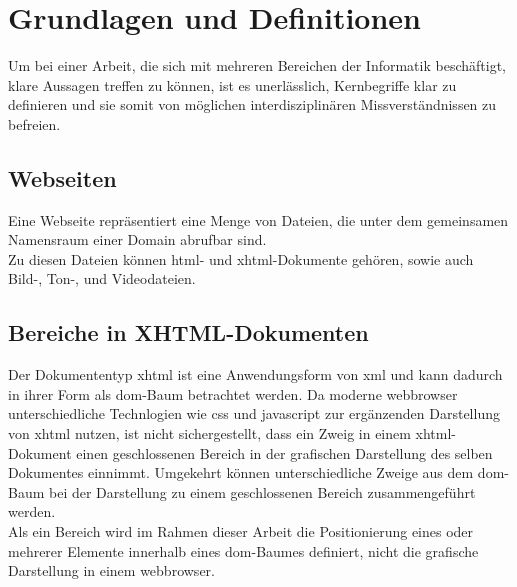 
\chapter{Grundlagen und Definitionen}
\label{chp:GrundlagenDefinitionen}

Um bei einer Arbeit, die sich mit mehreren Bereichen der Informatik beschäftigt, klare Aussagen treffen zu können, ist es unerlässlich, Kernbegriffe klar zu
definieren und sie somit von möglichen interdisziplinären Missverständnissen zu befreien.

\section{Webseiten}
\label{sec:GrundlagenDefinitionen:Webseiten}
Eine Webseite repräsentiert eine Menge von Dateien, die unter dem gemeinsamen Namensraum einer Domain abrufbar sind.\\
Zu diesen Dateien können \gls{html}- und \gls{xhtml}-Dokumente gehören, sowie auch Bild-, Ton-, und Videodateien.

\section{Bereiche in XHTML-Dokumenten}
\label{sec:GrundlagenDefinitionen:BereicheXHTML}
Der Dokumententyp \gls{xhtml} ist eine Anwendungsform von \gls{xml}\cite{xhtml:w3c} und kann dadurch in ihrer Form als \gls{dom}-Baum betrachtet
werden\cite{xhtml:oreilly}. Da moderne \Gls{webbrowser} unterschiedliche Technlogien wie \gls{css} und \gls{javascript} zur ergänzenden Darstellung von
\gls{xhtml} nutzen, ist nicht sichergestellt, dass ein Zweig in einem \gls{xhtml}-Dokument einen geschlossenen Bereich in der grafischen Darstellung des
selben Dokumentes einnimmt. Umgekehrt können unterschiedliche Zweige aus dem \gls{dom}-Baum bei der Darstellung zu einem geschlossenen Bereich zusammengeführt
werden.\\

Als ein Bereich wird im Rahmen dieser Arbeit die Positionierung eines oder mehrerer Elemente innerhalb eines \gls{dom}-Baumes definiert, nicht die grafische
Darstellung in einem \gls{webbrowser}.


